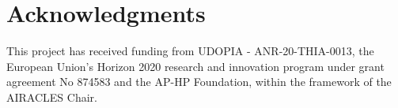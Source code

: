 \documentclass[
]{jss}
\begin{document}
\hypertarget{acknowledgments}{%
\section*{Acknowledgments}\label{acknowledgments}}

This project has received funding from UDOPIA - ANR-20-THIA-0013, the
European Union's Horizon 2020 research and innovation program under
grant agreement No 874583 and the AP-HP Foundation, within the framework
of the AIRACLES Chair.

\renewcommand\refname{References}

\end{document}

